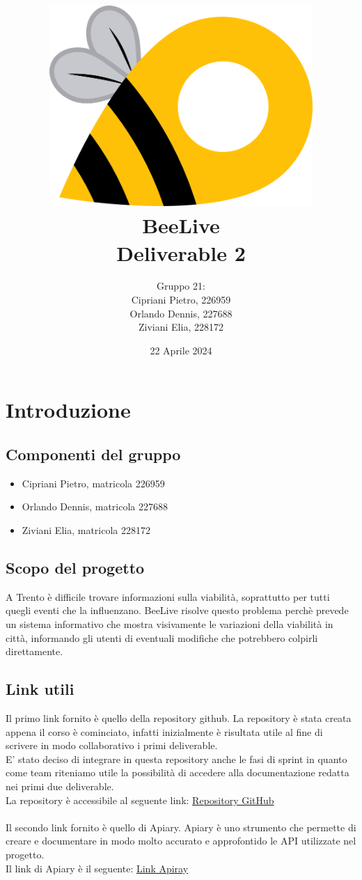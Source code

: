 \documentclass{article}
\title{\includegraphics[width=0.75\textwidth]{Images/BeeLive-Logo.png}\\\vspace{100pt}
\LARGE{\textbf{BeeLive\\Deliverable 2}}}
\author{Gruppo 21:\\
Cipriani Pietro, 226959\\
Orlando Dennis, 227688\\
Ziviani Elia, 228172}
\date{22 Aprile 2024}
\begin{document}
\maketitle
\thispagestyle{firstpage} %
\clearpage

\pagestyle{nonplain} %

\renewcommand{\contentsname}{Indice}
\tableofcontents

\clearpage

\section{Introduzione}

\subsection{Componenti del gruppo}
\begin{itemize}
    \item Cipriani Pietro, matricola 226959
    \item Orlando Dennis, matricola 227688
    \item Ziviani Elia, matricola 228172
\end{itemize}

\subsection{Scopo del progetto}
A Trento è difficile trovare informazioni sulla viabilità, soprattutto per tutti quegli eventi che la influenzano. BeeLive risolve questo problema perchè prevede un sistema informativo che mostra visivamente le variazioni della viabilità in città, informando gli utenti di eventuali modifiche che potrebbero colpirli direttamente.

\subsection{Link utili}
Il primo link fornito è quello della repository github. La repository è stata creata appena il corso è cominciato, infatti inizialmente è risultata utile al fine di scrivere in modo collaborativo i primi deliverable.\\
E' stato deciso di integrare in questa repository anche le fasi di sprint in quanto come team riteniamo utile la possibilità di accedere alla documentazione redatta nei primi due deliverable.\\
La repository è accessibile al seguente link: \href{https://github.com/ELI20ZIVI/BeeLive/}{Repository GitHub}\\ \\
Il secondo link fornito è quello di Apiary. Apiary è uno strumento che permette di creare e documentare in modo molto accurato e approfontido le API utilizzate nel progetto.\\
Il link di Apiary è il seguente: \href{https://beelive.docs.apiary.io/#}{Link Apiray}\\
\end{document}
